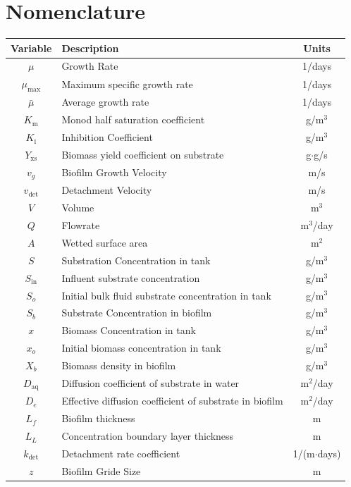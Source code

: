 \documentclass[letterpaper, twoside]{article}
\numberwithin{equation}{section}
\begin{document}
\section{Nomenclature}
\begin{tabular}{c l c}
  Variable & Description & Units\\ \hline
  $\mu$ & Growth Rate & 1/days\\
  $\mu_\mathrm{max}$  & Maximum specific growth rate & 1/days\\
  $\bar\mu$ & Average growth rate & 1/days\\
  $K_\mathrm{m}$ & Monod half saturation coefficient & g/m$^3$\\
  $K_\mathrm{i}$ & Inhibition Coefficient & g/m$^3$\\
  $Y_\mathrm{xs}$ & Biomass yield coefficient on substrate & g$\cdot$g/s\\
  $v_g$ & Biofilm Growth Velocity & m/s\\
  $v_\mathrm{det}$ & Detachment Velocity & m/s\\
  $V$ & Volume &m$^3$ \\
  $Q$	& Flowrate & m$^3$/day\\
  $A$	& Wetted surface area & m$^2$\\
  $S$ & Substration Concentration in tank & g/m$^3$\\
  $S_{\mathrm{in}}$ & Influent substrate concentration &  g/m$^3$ \\
  $S_o$ & Initial bulk fluid substrate concentration in tank &  g/m$^3$ \\
  $S_b$ & Substrate Concentration in biofilm & g/m$^3$ \\
  $x$ & Biomass Concentration in tank & g/m$^3$\\
  $x_o$ & Initial biomass concentration in tank &  g/m$^3$ \\
  $X_b$ & Biomass density in biofilm &  g/m$^3$ \\
  $D_\mathrm{aq}$ & Diffusion coefficient of substrate in water & m$^2$/day \\
  $D_e$ & Effective diffusion coefficient of substrate in biofilm & m$^2$/day \\
  $L_{f}$ & Biofilm thickness & m\\
  $L_L$ & Concentration boundary layer thickness & m \\
  $k_\mathrm{det}$ &	Detachment rate coefficient & 1/(m$\cdot$days)\\
  $z$ & Biofilm Gride Size & m
\end{tabular}
\end{document}

